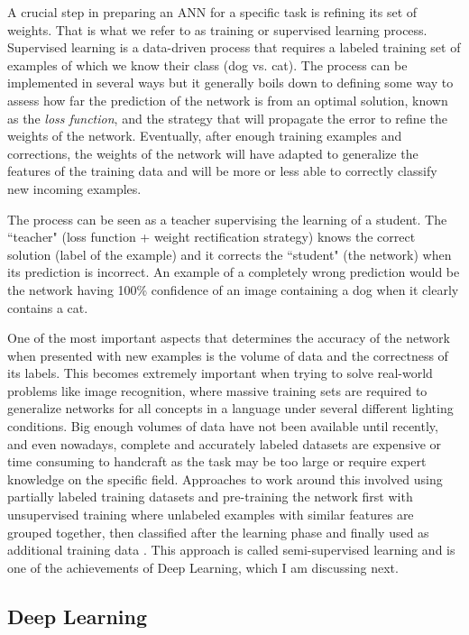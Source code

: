 A crucial step in preparing an ANN for a specific task is refining its set of weights.
That is what we refer to as training or supervised learning process.
Supervised learning is a data-driven process that requires a labeled training set of examples of which we know their class (dog vs. cat).
The process can be implemented in several ways but it generally boils down to defining some way to assess how far the prediction of the network is from an optimal solution, known as the \emph{loss function}, and the strategy that will propagate the error to refine the weights of the network.
Eventually, after enough training examples and corrections, the weights of the network will have adapted to generalize the features of the training data and will be more or less able to correctly classify new incoming examples.

The process can be seen as a teacher supervising the learning of a student.
The ``teacher" (loss function + weight rectification strategy) knows the correct solution (label of the example) and it corrects the ``student" (the network) when its prediction is incorrect.
An example of a completely wrong prediction would be the network having 100\% confidence of an image containing a dog when it clearly contains a cat.

One of the most important aspects that determines the accuracy of the network when presented with new examples is the volume of data and the correctness of its labels.
This becomes extremely important when trying to solve real-world problems like image recognition, where massive training sets are required to generalize networks for all concepts in a language under several different lighting conditions.
Big enough volumes of data have not been available until recently, and even nowadays, complete and accurately labeled datasets are expensive or time consuming to handcraft as the task may be too large or require expert knowledge on the specific field.
Approaches to work around this involved using partially labeled training datasets and pre-training the network first with unsupervised training where unlabeled examples with similar features are grouped together, then classified after the learning phase and finally used as additional training data \cite{Hinton2006}.
This approach is called semi-supervised learning and is one of the achievements of Deep Learning, which I am discussing next.


\subsection{Deep Learning}
\label{sub:theory:background:deep-learning}

